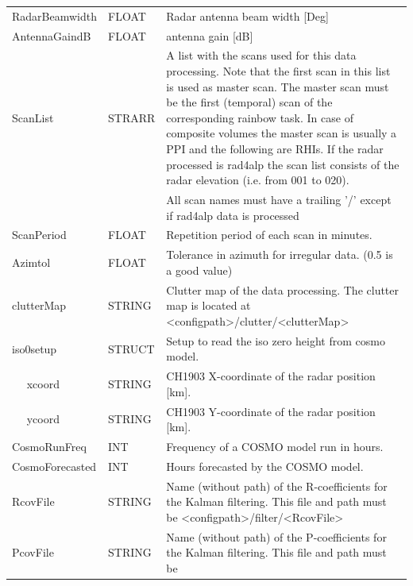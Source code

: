 \documentclass[a4paper,11pt,pdftex,twoside]{scrartcl}
\begin{document}
{{{\begin{longtable}{p{}p{}p{}}
RadarBeamwidth & FLOAT & Radar antenna beam width [Deg]\\
AntennaGaindB & FLOAT & antenna gain [dB]\\
ScanList           & STRARR    & A list with the scans used for this data processing.
                                 Note that the first scan in this list is used as master scan.
                                 The master scan must be the first (temporal) scan of the
                                 corresponding rainbow task. In case of composite volumes the master scan is usually a PPI and the following are RHIs. If the radar processed is rad4alp the scan list consists of the radar elevation (i.e. from 001 to 020).\\
                   &           & All scan names must have a trailing '/' except if rad4alp data is processed\\
ScanPeriod         & FLOAT     & Repetition period of each scan in minutes.\\
Azimtol            & FLOAT     & Tolerance in azimuth for irregular data. (0.5 is a good value)\\
clutterMap         & STRING    & Clutter map of the data processing. The clutter map is
                                 located at <configpath>/clutter/<clutterMap>\\
iso0setup          & STRUCT    & Setup to read the iso zero height from cosmo model.\\
$\quad$ xcoord     & STRING    & CH1903 X-coordinate of the radar position [km].\\
$\quad$ ycoord     & STRING    & CH1903 Y-coordinate of the radar position [km].\\
CosmoRunFreq & INT &  Frequency of a COSMO model run in hours.\\
CosmoForecasted & INT & Hours forecasted by the COSMO model.\\
RcovFile           & STRING    & Name (without path) of the R-coefficients for the Kalman
                                 filtering. This file and path must be
                                 <configpath>/filter/<RcovFile>\\
PcovFile           & STRING    & Name (without path) of the P-coefficients for the Kalman
                                 filtering. This file and path must be

\end{longtable}}}}
\end{document}
